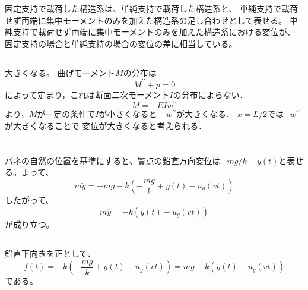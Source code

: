\documentclass[a4paper]{jsarticle}
\begin{document}
\subsubsection{}
固定支持で載荷した構造系は、単純支持で載荷した構造系と、
単純支持で載荷せず両端に集中モーメントのみを加えた構造系の足し合わせとして表せる。
単純支持で載荷せず両端に集中モーメントのみを加えた構造系における変位が、
固定支持の場合と単純支持の場合の変位の差に相当している。

\subsection{}
大きくなる。
曲げモーメント$M$の分布は
\begin{equation}
  M^{\prime \prime} + p = 0
\end{equation}
によって定まり，これは断面二次モーメント$I$の分布によらない．
\begin{equation}
  M = -E I w^{\prime \prime}
\end{equation}
より，$M$が一定の条件で$I$が小さくなると
$-w^{\prime \prime}$が大きくなる．
$x = L/2$では$-w^{\prime \prime}$が大きくなることで
変位が大きくなると考えられる．

\section{}
\subsection{}
バネの自然の位置を基準にすると、質点の鉛直方向変位は$-m g / k + y(t)$と表せる。よって、
\begin{equation}
  m \ddot{y} = -m g - k \left(-\frac{mg}{k}+ y(t) - u_g(vt)\right)
\end{equation}
したがって、
\begin{equation}
  \label{eq:equation_of_motion}
  m \ddot{y} = -k\left(y(t) - u_g(vt)\right)
\end{equation}
が成り立つ。

\subsection{}
鉛直下向きを正として、
\begin{equation}
  f(t) = -k \left(-\frac{mg}{k} + y(t) - u_g(vt)\right)
  = mg -k \left(y(t) - u_g(vt)\right)
\end{equation}
である。
\end{document}
